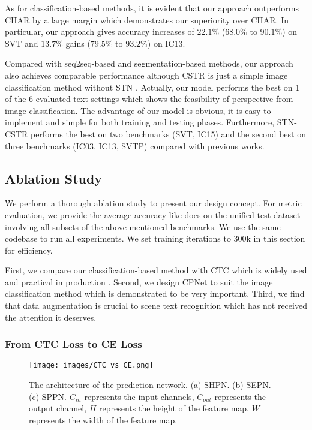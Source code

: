 \documentclass[final]{cvpr}
\begin{document}
As for classification-based methods, it is evident that our approach outperforms CHAR \cite{jaderberg14c} by a large margin which demonstrates our superiority over CHAR. In particular, our approach gives accuracy increases of $22.1\%$ ($68.0\%$ to $90.1\%$) on SVT and $13.7\%$ gains ($79.5\%$ to $93.2\%$) on IC13.

Compared with seq2seq-based and segmentation-based methods, our approach also achieves comparable performance although 
CSTR is just a simple image classification method without STN \cite{shi2018aster}.
Actually, our model performs the best on 1 of the 6 evaluated text settings which shows the feasibility of perspective from image classification. The advantage of our model is obvious, it is easy to implement and simple for both training and testing phases. 
Furthermore, STN-CSTR performs the best on two benchmarks (SVT, IC15) and the second best on three benchmarks (IC03, IC13, SVTP) compared with previous works.

\subsection{Ablation Study}
\label{section.ablation_study}
We perform a thorough ablation study to present our design concept. For metric evaluation, we provide the average accuracy like \cite{baek2019wrong} does on the unified test dataset involving all subsets of the above mentioned benchmarks. We use the same codebase to run all experiments. We set training iterations to 300k in this section for efficiency.

First, we compare our classification-based method with CTC which is widely used and practical in production \cite{borisyuk2018rosetta,du2020pp}.
Second, we design CPNet to suit the image classification method which is demonstrated to be very important.
Third, we find that data augmentation is crucial to scene text recognition which has not received the attention it deserves.

\subsubsection{From CTC Loss to CE Loss}
\label{section.from_CTC_loss_to_CE_loss}

\begin{figure*}[ht]
\centering
  \texttt{[image: images/CTC\_vs\_CE.png]}
\centering
\caption{The architecture of the prediction network. (a) SHPN. (b) SEPN. (c) SPPN. $C_{in}$ represents the input channels, $C_{out}$ represents the output channel, $H$ represents the height of the feature map, $W$ represents the width of the feature map.}
\label{fig.CTC_vs_CE}
\end{figure*}
\end{document}
